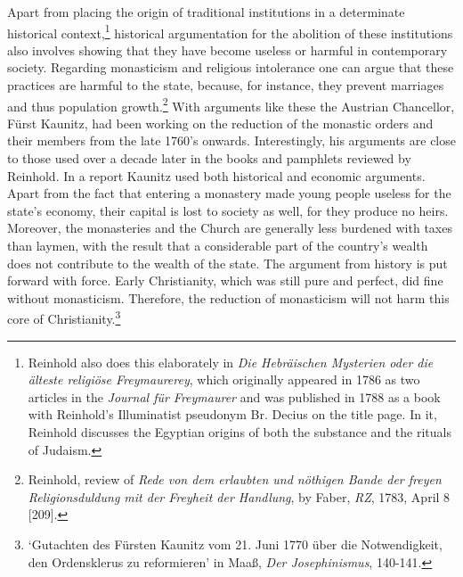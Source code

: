 Apart from placing the origin of traditional institutions in a determinate historical context,\footnote{ Reinhold also does this elaborately in \textit{\-Die Hebr\"{a}ischen Mysterien oder die \"{a}lteste religi\"{o}se Freymaurerey}, which originally appeared in 1786 as two articles in the \textit{Journal f\"{u}r Freymaurer} and was published in 1788 as a book with Reinhold's Illuminatist pseudonym Br. Decius on the title page. In it, Reinhold discusses the Egyptian origins of both the substance and the rituals of Judaism. } historical argumentation for the abolition of these institutions also involves showing that they have become useless or harmful in contemporary society. Regarding monasticism and religious intolerance one can argue that these practices are harmful to the state, because, for instance, they prevent marriages and thus population growth.\footnote{ Reinhold, review of \textit{Rede von dem erlaubten und n\"{o}thigen Bande der freyen Religionsduldung mit der Freyheit der Handlung}, by Faber, \textit{RZ}, 1783, April 8 [209].} With arguments like these the Austrian Chancellor, F\"{u}rst Kaunitz, had been working on the reduction of the monastic orders and their members from the late 1760's onwards. Interestingly, his arguments are close to those used over a decade later in the books and pamphlets reviewed by Reinhold. In a report Kaunitz used both historical and economic arguments. Apart from the fact that entering a monastery made young people useless for the state's economy, their capital is lost to society as well, for they produce no heirs. Moreover, the monasteries and the Church are generally less burdened with taxes than laymen, with the result that a considerable part of the country's wealth does not contribute to the wealth of the state. The argument from history is put forward with force. Early Christianity, which was still pure and perfect, did fine without monasticism. Therefore, the reduction of monasticism will not harm this core of Christianity.\footnote{ `Gutachten des F\"{u}rsten Kaunitz vom 21. Juni 1770 \"{u}ber die Notwendigkeit, den Ordensklerus zu reformieren' in Maa\ss{}, \textit{Der Josephinismus}, 140{-}141.} 

